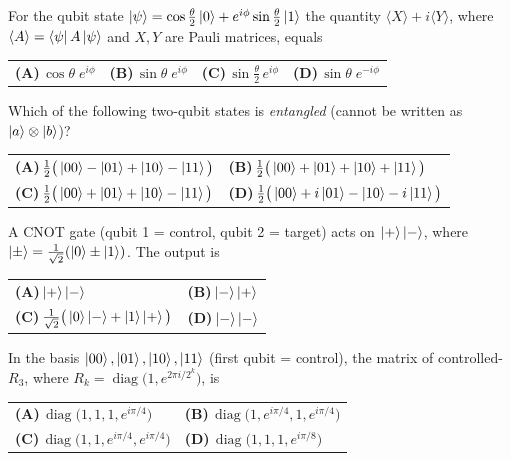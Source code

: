 \documentclass[11pt,a4paper]{article}
\newcommand{\optlabel}[1]{\textbf{(#1)}}
\newenvironment{qitem}[1]{\begin{list}{}{\setlength{\leftmargin}{3.3em}\setlength{\labelwidth}{3.1em}%
  \setlength{\labelsep}{0.2em}\setlength{\topsep}{3pt}\setlength{\parsep}{3pt}}\item[\textbf{Q.#1}\hfill]}{\end{list}}
\newcommand{\qsep}{\par\vspace{2pt}{\color{black!15}\hrule}\vspace{4pt}}
\begin{document}
\begin{qitem}{24}
For the qubit state $\ket{\psi} = \cos\frac{\theta}{2}\ket{0} + e^{i\phi}\sin\frac{\theta}{2}\ket{1}$ the quantity
$\langle X\rangle + i\langle Y\rangle$, where $\langle A\rangle = \bra{\psi}A\ket{\psi}$ and $X, Y$ are Pauli matrices, equals
\par\smallskip\noindent\begin{tabularx}{\linewidth}{@{}*{4}{L}@{}}
\optlabel{A}\,$\cos\theta\; e^{i\phi}$ & \optlabel{B}\,$\sin\theta\; e^{i\phi}$ & \optlabel{C}\,$\sin\frac{\theta}{2}\, e^{i\phi}$ & \optlabel{D}\,$\sin\theta\; e^{-i\phi}$
\end{tabularx}
\end{qitem}
\qsep

\begin{qitem}{25}
Which of the following two-qubit states is \emph{entangled} (cannot be written as $\ket{a}\otimes\ket{b}$)?
\par\smallskip\noindent\begin{tabularx}{\linewidth}{@{}*{2}{L}@{}}
\optlabel{A}\,$\frac12\big(\ket{00} - \ket{01} + \ket{10} - \ket{11}\big)$ & \optlabel{B}\,$\frac12\big(\ket{00} + \ket{01} + \ket{10} + \ket{11}\big)$ \\[3pt]
\optlabel{C}\,$\frac12\big(\ket{00} + \ket{01} + \ket{10} - \ket{11}\big)$ & \optlabel{D}\,$\frac12\big(\ket{00} + i\ket{01} - \ket{10} - i\ket{11}\big)$
\end{tabularx}
\end{qitem}
\qsep

\begin{qitem}{26}
A CNOT gate (qubit 1 = control, qubit 2 = target) acts on $\ket{+}\ket{-}$, where
$\ket{\pm} = \frac{1}{\sqrt2}(\ket0 \pm \ket1)$. The output is
\par\smallskip\noindent\begin{tabularx}{\linewidth}{@{}*{2}{L}@{}}
\optlabel{A}\,$\ket{+}\ket{-}$ & \optlabel{B}\,$\ket{-}\ket{+}$ \\[3pt]
\optlabel{C}\,$\frac{1}{\sqrt2}\big(\ket{0}\ket{-} + \ket{1}\ket{+}\big)$ & \optlabel{D}\,$\ket{-}\ket{-}$
\end{tabularx}
\end{qitem}
\qsep

\begin{qitem}{27}
In the basis $\ket{00}, \ket{01}, \ket{10}, \ket{11}$ (first qubit = control), the matrix of controlled-$R_3$, where
$R_k = \operatorname{diag}\big(1, e^{2\pi i/2^k}\big)$, is
\par\smallskip\noindent\begin{tabularx}{\linewidth}{@{}*{2}{L}@{}}
\optlabel{A}\,$\operatorname{diag}\big(1, 1, 1, e^{i\pi/4}\big)$ & \optlabel{B}\,$\operatorname{diag}\big(1, e^{i\pi/4}, 1, e^{i\pi/4}\big)$ \\[3pt]
\optlabel{C}\,$\operatorname{diag}\big(1, 1, e^{i\pi/4}, e^{i\pi/4}\big)$ & \optlabel{D}\,$\operatorname{diag}\big(1, 1, 1, e^{i\pi/8}\big)$
\end{tabularx}
\end{qitem}
\qsep
\end{document}
